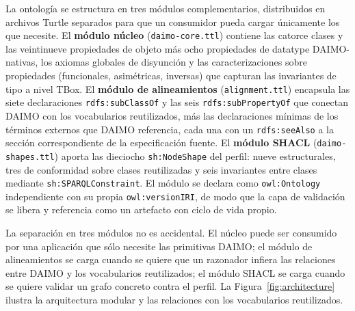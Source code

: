 \documentclass[11pt,a4paper]{article}
\newcommand{\code}[1]{\texttt{#1}}
\begin{document}
La ontología se estructura en tres módulos complementarios, distribuidos en archivos Turtle separados para que un consumidor pueda cargar únicamente los que necesite. El \textbf{módulo núcleo} (\code{daimo-core.ttl}) contiene las catorce clases y las veintinueve propiedades de objeto más ocho propiedades de datatype DAIMO-nativas, los axiomas globales de disyunción y las caracterizaciones sobre propiedades (funcionales, asimétricas, inversas) que capturan las invariantes de tipo a nivel TBox. El \textbf{módulo de alineamientos} (\code{alignment.ttl}) encapsula las siete declaraciones \code{rdfs:subClassOf} y las seis \code{rdfs:subPropertyOf} que conectan DAIMO con los vocabularios reutilizados, más las declaraciones mínimas de los términos externos que DAIMO referencia, cada una con un \code{rdfs:seeAlso} a la sección correspondiente de la especificación fuente. El \textbf{módulo SHACL} (\code{daimo-shapes.ttl}) aporta las dieciocho \code{sh:NodeShape} del perfil: nueve estructurales, tres de conformidad sobre clases reutilizadas y seis invariantes entre clases mediante \code{sh:SPARQLConstraint}. El módulo se declara como \code{owl:Ontology} independiente con su propia \code{owl:versionIRI}, de modo que la capa de validación se libera y referencia como un artefacto con ciclo de vida propio.

La separación en tres módulos no es accidental. El núcleo puede ser consumido por una aplicación que sólo necesite las primitivas DAIMO; el módulo de alineamientos se carga cuando se quiere que un razonador infiera las relaciones entre DAIMO y los vocabularios reutilizados; el módulo SHACL se carga cuando se quiere validar un grafo concreto contra el perfil. La Figura~\ref{fig:architecture} ilustra la arquitectura modular y las relaciones con los vocabularios reutilizados.
\end{document}

